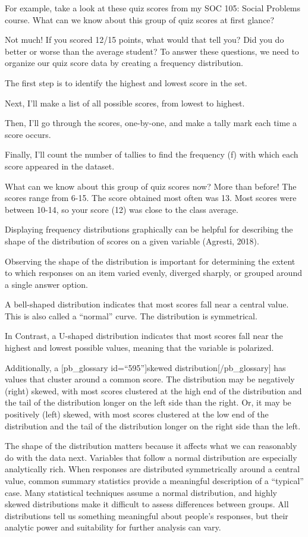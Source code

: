 \documentclass[
  letterpaper,
  DIV=11,
  numbers=noendperiod]{scrreprt}
\begin{document}
For example, take a look at these quiz scores from my SOC 105: Social
Problems course. What can we know about this group of quiz scores at
first glance?

Not much! If you scored 12/15 points, what would that tell you? Did you
do better or worse than the average student? To answer these questions,
we need to organize our quiz score data by creating a frequency
distribution.

The first step is to identify the highest and lowest score in the set.

Next, I'll make a list of all possible scores, from lowest to highest.

Then, I'll go through the scores, one-by-one, and make a tally mark each
time a score occurs.

Finally, I'll count the number of tallies to find the frequency (f) with
which each score appeared in the dataset.

What can we know about this group of quiz scores now? More than before!
The scores range from 6-15. The score obtained most often was 13. Most
scores were between 10-14, so your score (12) was close to the class
average.

Displaying frequency distributions graphically can be helpful for
describing the shape of the distribution of scores on a given variable
(Agresti, 2018).

Observing the shape of the distribution is important for determining the
extent to which responses on an item varied evenly, diverged sharply, or
grouped around a single answer option.

A bell-shaped distribution indicates that most scores fall near a
central value. This is also called a ``normal'' curve. The distribution
is symmetrical.

In Contrast, a U-shaped distribution indicates that most scores fall
near the highest and lowest possible values, meaning that the variable
is polarized.

Additionally, a {[}pb\_glossary id=``595''{]}skewed
distribution{[}/pb\_glossary{]} has values that cluster around a common
score. The distribution may be negatively (right) skewed, with most
scores clustered at the high end of the distribution and the tail of the
distribution longer on the left side than the right. Or, it may be
positively (left) skewed, with most scores clustered at the low end of
the distribution and the tail of the distribution longer on the right
side than the left.

The shape of the distribution matters because it affects what we can
reasonably do with the data next. Variables that follow a normal
distribution are especially analytically rich. When responses are
distributed symmetrically around a central value, common summary
statistics provide a meaningful description of a ``typical'' case. Many
statistical techniques assume a normal distribution, and highly skewed
distributions make it difficult to assess differences between groups.
All distributions tell us something meaningful about people's responses,
but their analytic power and suitability for further analysis can vary.
\end{document}
